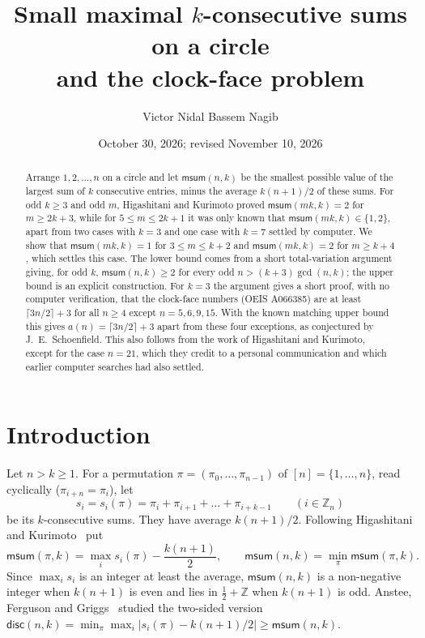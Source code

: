 \documentclass[11pt]{amsart}
\title{Small maximal $k$-consecutive sums on a circle\\ and the clock-face problem}
\author{Victor Nidal Bassem Nagib}
\date{October 30, 2026; revised November 10, 2026}
\theoremstyle{remark}
\newcommand{\msum}{\mathsf{msum}}
\newcommand{\disc}{\mathsf{disc}}
\newcommand{\Z}{\mathbb{Z}}
\begin{document}
\begin{abstract}
Arrange $1,2,\dots,n$ on a circle and let $\msum(n,k)$ be the smallest possible value of the largest sum of $k$
consecutive entries, minus the average $k(n+1)/2$ of these sums. For odd $k\ge 3$ and odd $m$, Higashitani and
Kurimoto proved $\msum(mk,k)=2$ for $m\ge 2k+3$, while for $5\le m\le 2k+1$ it was only known that
$\msum(mk,k)\in\{1,2\}$, apart from two cases with $k=3$ and one case with $k=7$ settled by computer. We show that $\msum(mk,k)=1$ for $3\le m\le k+2$ and $\msum(mk,k)=2$ for
$m\ge k+4$, which settles this case. The lower bound comes from a short total-variation argument giving, for
odd $k$, $\msum(n,k)\ge 2$ for every odd $n>(k+3)\gcd(n,k)$; the upper bound is an explicit construction. For
$k=3$ the argument gives a short proof, with no computer verification, that the clock-face numbers (OEIS A066385)
are at least $\lceil 3n/2\rceil+3$ for all $n\ge 4$ except $n=5,6,9,15$. With the known matching upper bound this
gives $a(n)=\lceil 3n/2\rceil+3$ apart from these four exceptions, as conjectured by J.~E.~Schoenfield. This also
follows from the work of Higashitani and Kurimoto, except for the case $n=21$, which they credit to a personal
communication and which earlier computer searches had also settled.
\end{abstract}

\maketitle

\section{Introduction}

Let $n>k\ge 1$. For a permutation $\pi=(\pi_0,\dots,\pi_{n-1})$ of $[n]=\{1,\dots,n\}$, read cyclically
($\pi_{i+n}=\pi_i$), let
\[
  s_i=s_i(\pi)=\pi_i+\pi_{i+1}+\dots+\pi_{i+k-1}\qquad(i\in\Z_n)
\]
be its $k$-consecutive sums. They have average $k(n+1)/2$. Following Higashitani and Kurimoto~\cite{HK} put
\[
  \msum(\pi,k)=\max_{i}s_i(\pi)-\frac{k(n+1)}{2},\qquad \msum(n,k)=\min_{\pi}\msum(\pi,k).
\]
Since $\max_i s_i$ is an integer at least the average, $\msum(n,k)$ is a non-negative integer when $k(n+1)$ is even
and lies in $\frac12+\Z$ when $k(n+1)$ is odd. Anstee, Ferguson and Griggs~\cite{AFG} studied the two-sided
version $\disc(n,k)=\min_\pi\max_i|s_i(\pi)-k(n+1)/2|\ge\msum(n,k)$.
\end{document}
